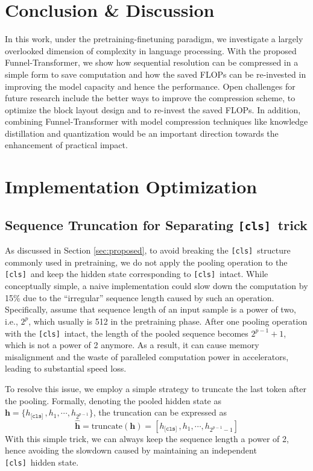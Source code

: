 \documentclass{article}
\theoremstyle{custom}
\newcommand{\seq}[1]{\left[ {#1} \right]}
\def\rvh{{\mathbf{h}}}
\newcommand{\cls}{\texttt{[cls]}~}
\begin{document}
 \section{Conclusion \& Discussion}
\label{sec:summary}
In this work, under the pretraining-finetuning paradigm, we investigate a largely overlooked dimension of complexity in language processing.
With the proposed Funnel-Transformer, we show how sequential resolution can be compressed in a simple form to save computation and how the saved FLOPs can be re-invested in improving the model capacity and hence the performance.
Open challenges for future research include the better ways to improve the compression scheme, to optimize the block layout design and to re-invest the saved FLOPs.
In addition, combining Funnel-Transformer with model compression techniques like knowledge distillation and quantization would be an important direction towards the enhancement of practical impact.
 




\clearpage
\appendix
\section{Implementation Optimization}
\subsection{Sequence Truncation for Separating \cls trick}
\label{sec:appendix-seq-trunc}
As discussed in Section \ref{sec:proposed}, to avoid breaking the \cls structure commonly used in pretraining, we do not apply the pooling operation to the \cls and keep the hidden state corresponding to \cls intact.
While conceptually simple, a naive implementation could slow down the computation by 15\% due to the ``irregular'' sequence length caused by such an operation.
Specifically, assume that sequence length of an input sample is a power of two, i.e., $2^p$, which usually is 512 in the pretraining phase.
After one pooling operation with the \cls intact, the length of the pooled sequence becomes $2^{p-1} + 1$, which is not a power of 2 anymore.
As a result, it can cause memory misalignment and the waste of paralleled computation power in accelerators, leading to substantial speed loss.

To resolve this issue, we employ a simple strategy to truncate the last token after the pooling.
Formally, denoting the pooled hidden state as $\rvh = \{h_{\cls}, h_1, \cdots,  h_{2^{p-1}}\} $, the truncation can be expressed as
\begin{equation}
\hat{\rvh} = \text{truncate}(\rvh) = \seq{h_{\cls}, h_1, \cdots,  h_{2^{p-1}-1}}
\end{equation}
With this simple trick, we can always keep the sequence length a power of 2, hence avoiding the slowdown caused by maintaining an independent \cls hidden state.
\end{document}
